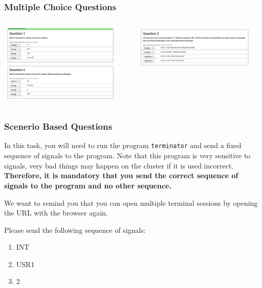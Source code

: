 \begin{frame}
  \frametitle{Multiple Choice Questions}
  \begin{columns}
   \begin{column}{.5\textwidth}
      \includegraphics[width=0.9\textwidth]{images/questions_2}
   \end{column}
   \begin{column}{.5\textwidth}
       \centering
      \includegraphics[width=0.9\textwidth]{images/question_1}
    \end{column}
  \end{columns}
\end{frame}

\begin{frame}
  \frametitle{Scenerio Based Questions}

\begin{tcolorbox}[colback=gray!5,colframe=green!40!black,title=Here:]
\footnotesize
In this task, you will need to run the program \texttt{terminator} and send a fixed sequence of signals to the program.
Note that this program is very sensitive to signals, very bad things may happen on the cluster if it is used incorrect. \textbf{Therefore, it is mandatory that you send the correct sequence of signals to the program and no other sequence.} 

We want to remind you that you can open multiple terminal sessions by opening the URL with the browser again.

Please send the following sequence of signals: 
\begin{enumerate}
  \item INT
  \item USR1
  \item 2
\end{enumerate}
\end{tcolorbox}

\end{frame}

